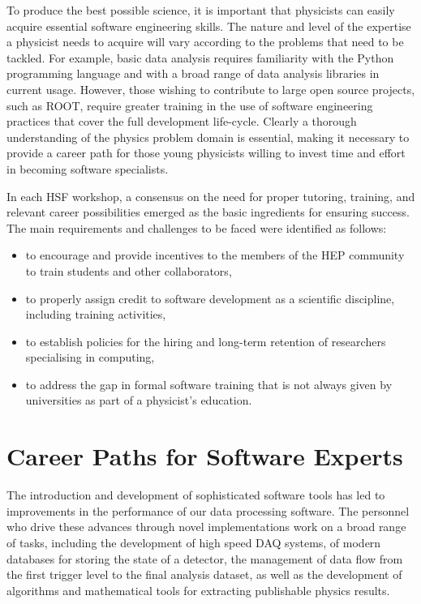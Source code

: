\documentclass[12pt,a4paper]{article}
\begin{document}
To produce the best possible science, it is important that physicists can easily acquire
essential software engineering skills. The nature and level of the expertise a
physicist needs to acquire will vary according to the problems that need to be tackled.
For example, basic data analysis requires familiarity with the Python programming language
and with a broad range of data analysis libraries in current usage. However, those
wishing to contribute to large open source projects, such as ROOT, require greater
training in the use of software engineering practices that cover the full development
life-cycle. Clearly a thorough understanding of the physics problem domain is
essential, making it necessary to provide a career path for those
young physicists willing to invest time and effort in becoming software specialists.

In each HSF workshop, a consensus on the need for proper tutoring, training,
and relevant career possibilities emerged as the basic ingredients for ensuring success.
The main requirements and challenges to be faced were identified as follows:

\begin{itemize}
    \item to encourage and provide incentives to the members of the HEP
    community to train students and other collaborators,
    \item to properly assign credit to software development as a scientific
    discipline, including training activities,
    \item to establish policies for the hiring and long-term retention of researchers
    specialising in computing,
    \item to address the gap in formal software training that is not always
    given by universities as part of a physicist's education.
\end{itemize}

\section{Career Paths for Software Experts}


The introduction and development of sophisticated software tools has led to
improvements in the performance of our data processing software. The
personnel who drive these advances through novel implementations work on a broad
range of tasks, including the development of high speed DAQ systems, of modern databases for
storing the state of a detector, the management of data flow from the first trigger
level to the final analysis dataset, as well as the development of algorithms and
mathematical tools for extracting publishable physics results.
\end{document}
